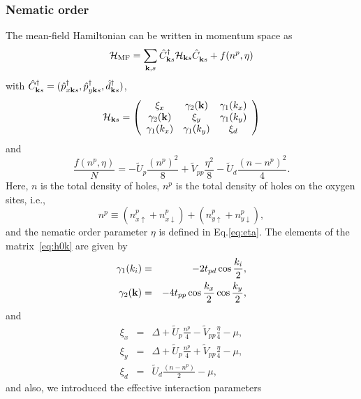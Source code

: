 \documentclass[prb, twocolumn,showpacs,preprintnumbers,amsmath,amssymb, floatfix]{revtex4}
\begin{document}
\subsubsection{Nematic order}
The mean-field Hamiltonian can be written in momentum space as
\begin{equation}
  \mathcal{H}_{\rm MF} = \sum_{{\bf k}, s} \hat{C}^{\dag}_{{\bf k} s}\mathcal{H}_{{\bf k} s}\hat{C}^{\phantom{\dag}}_{{\bf k} s} + f(n^{p}, \eta)
  \label{eq:mfhamiltonian}
\end{equation}
with $\hat{C}^{\dag}_{{\bf k} s} = (\hat{p}^{\dag}_{x{\bf k} s}, \hat{p}^{\dag}_{y{\bf k} s}, \hat{d}^{\dag}_{{\bf k} s})$,
\begin{equation}
  \mathcal{H}_{{\bf k} s} = \left(\begin{array}{ccc} \xi_{x}& \gamma_2({\bf k})& \gamma_1(k_x)\\ \gamma_2({\bf k})&\xi_{y}& \gamma_1(k_y)\\ \gamma_1(k_x)& \gamma_1(k_y)&\xi_{d}\end{array}\right)
  \label{eq:h0k}
\end{equation}
and
\begin{equation}
  \frac{f(n^{p}, \eta)}{N} = -\tilde{U}_{p} \frac{(n^{p})^2}{8} + \tilde{V}_{pp}\frac{\eta^{2}}{8} - \tilde{U}_{d}\frac{(n-n^{p})^2}{4}.
  \label{eq:mutilde}
\end{equation}
Here, $n$ is the total
density of holes, $n^p$ is the total
density of holes on the oxygen sites, i.e., 
\begin{equation}
  n^p\equiv (n_{x\uparrow}^p+n_{x\downarrow}^{p}) + (n_{y\uparrow}^p + n_{y\downarrow}^p),
  \label{eq:np}
\end{equation}
and the nematic order parameter $\eta$ is defined in Eq.\eqref{eq:eta}.
The elements of the matrix~\eqref{eq:h0k} are given by
\begin{eqnarray}
  \gamma_1(k_i) &=& -2t_{pd}\cos\frac{k_i}{2}, \label{eq:gammas}\\
  \gamma_2({\bf k}) &=& -4t_{pp}\cos\frac{k_x}{2}\cos\frac{k_y}{2},
\end{eqnarray}
and
\begin{eqnarray}
  \xi_{x} &=& \Delta + \tilde{U}_{p} \frac{n^{p}}{4} - \tilde{V}_{pp}\frac{\eta}{4} - \mu,\\
  \xi_{y} &=& \Delta + \tilde{U}_{p} \frac{n^{p}}{4} + \tilde{V}_{pp}\frac{\eta}{4} - \mu,\\
  \xi_{d} &=& \tilde{U}_{d} \frac{(n-n^p)}{2} - \mu,
  \label{eqn:diag}
\end{eqnarray}
and also, we introduced the effective interaction parameters
\end{document}
